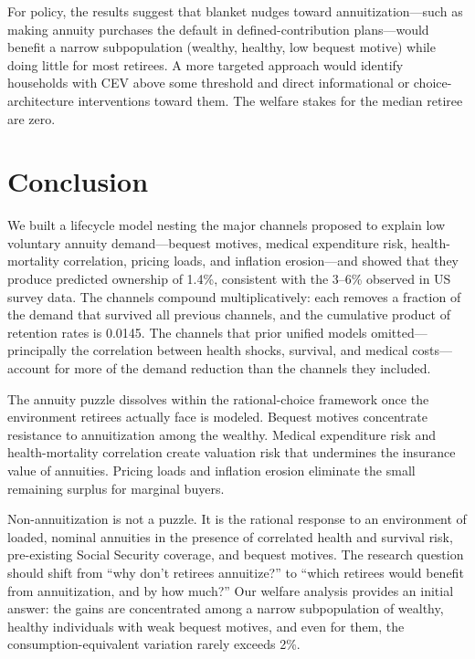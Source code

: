 \documentclass[12pt]{article}
\begin{document}
For policy, the results suggest that blanket nudges toward annuitization---such as making annuity purchases the default in defined-contribution plans---would benefit a narrow subpopulation (wealthy, healthy, low bequest motive) while doing little for most retirees. A more targeted approach would identify households with CEV above some threshold and direct informational or choice-architecture interventions toward them. The welfare stakes for the median retiree are zero.


\section{Conclusion}
\label{sec:conclusion}

We built a lifecycle model nesting the major channels proposed to explain low voluntary annuity demand---bequest motives, medical expenditure risk, health-mortality correlation, pricing loads, and inflation erosion---and showed that they produce predicted ownership of 1.4\%, consistent with the 3--6\% observed in US survey data. The channels compound multiplicatively: each removes a fraction of the demand that survived all previous channels, and the cumulative product of retention rates is 0.0145. The channels that prior unified models omitted---principally the correlation between health shocks, survival, and medical costs---account for more of the demand reduction than the channels they included.

The annuity puzzle dissolves within the rational-choice framework once the environment retirees actually face is modeled. Bequest motives concentrate resistance to annuitization among the wealthy. Medical expenditure risk and health-mortality correlation create valuation risk that undermines the insurance value of annuities. Pricing loads and inflation erosion eliminate the small remaining surplus for marginal buyers.

Non-annuitization is not a puzzle. It is the rational response to an environment of loaded, nominal annuities in the presence of correlated health and survival risk, pre-existing Social Security coverage, and bequest motives. The research question should shift from ``why don't retirees annuitize?'' to ``which retirees would benefit from annuitization, and by how much?'' Our welfare analysis provides an initial answer: the gains are concentrated among a narrow subpopulation of wealthy, healthy individuals with weak bequest motives, and even for them, the consumption-equivalent variation rarely exceeds 2\%.
\end{document}
